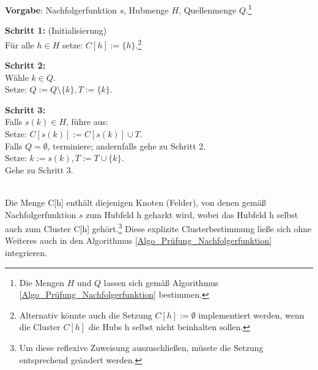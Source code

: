 \begin{algo}[Clusterbestimmung]
\label{Algo_Clusterbestimmung}
\textbf{Vorgabe}: Nachfolgerfunktion $s$, Hubmenge $H$, Quellenmenge $Q$.\footnote{Die Mengen $H$ und $Q$ lassen sich gemäß Algorithmus \ref{Algo_Prüfung_Nachfolgerfunktion} bestimmen.}

\noindent 
\textbf{Schritt 1:} (Initialisierung)\\
\phantom \quad Für alle $h \in H$ setze: $C[h] := \{h\}$.\footnote{Alternativ könnte auch die Setzung $C[h] := \emptyset$ implementiert werden, wenn die Cluster $C[h]$ die Hubs h selbst nicht beinhalten sollen.} 

\noindent 
\textbf{Schritt 2:}\\
\phantom \quad Wähle $k \in Q$. \\
\phantom \quad Setze: $Q := Q\setminus \{k\}, T := \{k\}$.

\noindent 
\textbf{Schritt 3:}\\
\phantom \quad Falls $s(k) \in H$, führe aus:\\
\phantom \quad \qquad Setze: $C[s(k)] := C[s(k)] \cup T$.\\
\phantom \quad \qquad Falls $Q = \emptyset$, terminiere; andernfalls gehe zu Schritt 2.\\
\phantom \quad Setze: $k := s(k), T := T \cup \{k\}$.\\
\phantom \quad Gehe zu Schritt 3.
\end{algo}

\phantom \\
\noindent Die Menge C[h] enthält diejenigen Knoten (Felder), von denen gemäß Nachfolgerfunktion $s$ zum Hubfeld h geharkt wird, wobei das Hubfeld h selbst auch zum Cluster C[h] gehört.\footnote{Um diese reflexive Zuweisung auszuschließen, müsste die Setzung entsprechend geändert werden.} Diese explizite Clusterbestimmung ließe sich ohne Weiteres auch in den Algorithmus \ref{Algo_Prüfung_Nachfolgerfunktion} integrieren. \\



